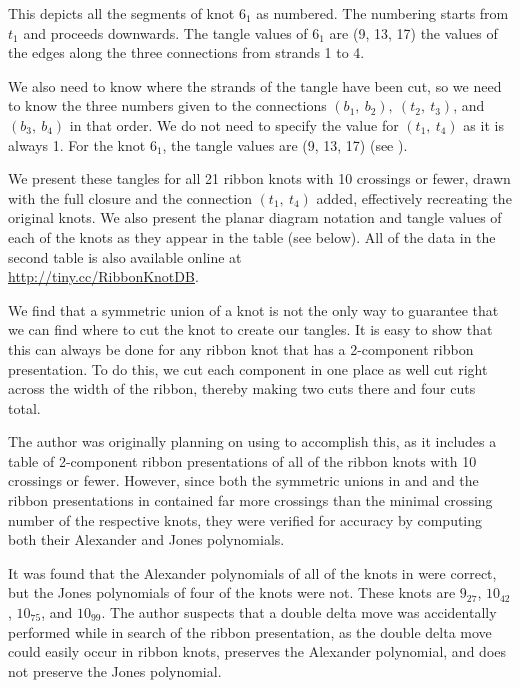 \begin{paper}
{This depicts all the segments of knot $6_1$ as numbered.
The numbering starts from $t_1$ and proceeds downwards.
The tangle values of $6_1$ are (9, 13, 17) the values of the edges along the
three connections from strands 1 to 4.}

We also need to know where the strands of the tangle have been cut, so we need
to know the three numbers given to the connections $(b_1,~b_2),~(t_2,~t_3)$, and
$(b_3,~b_4)$ in that order.
We do not need to specify the value for $(t_1,~t_4)$ as it is always 1.
For the knot $6_1$, the tangle values are (9, 13, 17) (see \figExample).

We present these tangles for all 21 ribbon knots with 10 crossings or fewer,
drawn with the full closure and the connection $(t_1,~t_4)$ added, effectively
recreating the original knots.
We also present the planar diagram notation and tangle values of each of the
knots as they appear in the table (see below).
All of the data in the second table is also available online at\\
\url{http://tiny.cc/RibbonKnotDB}.


We find that a symmetric union of a knot is not the only way to guarantee that
we can find where to cut the knot to create our tangles.
It is easy to show that this can always be done for any ribbon knot that has a
2-component ribbon presentation.
To do this, we cut each component in one place as well cut right across the
width of the ribbon, thereby making two cuts there and four cuts total.

The author was originally planning on using \cite{knots} to accomplish this, as
it includes a table of 2-component ribbon presentations of all of the ribbon
knots with 10 crossings or fewer.
However, since both the symmetric unions in \cite{one} and \cite{many} and the
ribbon presentations in \cite{knots} contained far more crossings than the
minimal crossing number of the respective knots, they were verified for accuracy
by computing both their Alexander and Jones polynomials.

It was found that the Alexander polynomials of all of the knots in \cite{knots}
were correct, but the Jones polynomials of four of the knots were not.
These knots are $9_{27}$, $10_{42}$, $10_{75}$, and $10_{99}$.
The author suspects that a double delta move was accidentally performed while in
search of the ribbon presentation, as the double delta move could easily occur
in ribbon knots, preserves the Alexander polynomial, and does not preserve the
Jones polynomial.


\end{paper}
